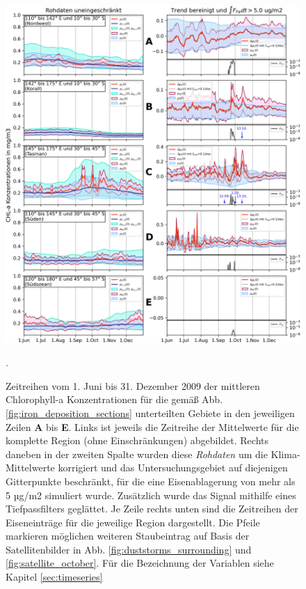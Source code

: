 \documentclass[12pt,a4paper,onecolumn]{scrartcl}
\begin{document}
\begin{figure}[!htb]
\includegraphics[width=\textwidth]{bilder/timeseries_all.png}
\caption{Zeitreihen vom 1. Juni bis 31. Dezember 2009 der mittleren Chlorophyll-a Konzentrationen für die gemäß Abb. \ref{fig:iron_deposition_sections} unterteilten Gebiete in den jeweiligen Zeilen \textbf{A} bis \textbf{E}. Links ist jeweils die Zeitreihe der Mittelwerte für die komplette Region (ohne Einschränkungen) abgebildet. Rechts daneben in der zweiten Spalte wurden diese \textit{Rohdaten} um die Klima-Mittelwerte korrigiert und das Untersuchungsgebiet auf diejenigen Gitterpunkte beschränkt, für die eine Eisenablagerung von mehr als 5 µg/m2 simuliert wurde. Zusätzlich wurde das Signal mithilfe eines Tiefpassfilters geglättet. Je Zeile rechts unten sind die Zeitreihen der Eiseneinträge für die jeweilige Region dargestellt. Die Pfeile markieren möglichen weiteren Staubeintrag auf Basis der Satellitenbilder in Abb. \ref{fig:duststorms_surrounding} und \ref{fig:satellite_october}. Für die Bezeichnung der Variablen siehe Kapitel \ref{sec:timeseries}}. \label{fig:timeseries_full}
\end{figure}
\end{document}

